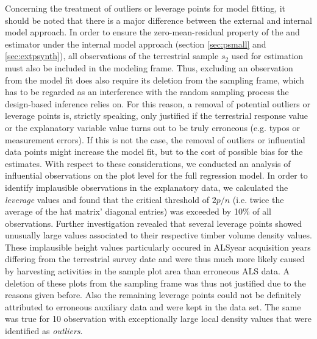 

Concerning the treatment of outliers or leverage points for model fitting, it should be noted that there is a major difference between the external and internal model approach. In order to ensure the zero-mean-residual property of the \psmall{} and \extpsynth{} estimator under the internal model approach (section \ref{sec:psmall} and \ref{sec:extpsynth}), all observations of the terrestrial sample $s_2$ used for estimation must also be included in the modeling frame. Thus, excluding an observation from the model fit does also require its deletion from the sampling frame, which has to be regarded as an interference with the random sampling process the design-based inference relies on. For this reason, a removal of potential outliers or leverage points is, strictly speaking, only justified if the terrestrial response value or the explanatory variable value turns out to be truly erroneous (e.g. typos or measurement errors). If this is not the case, the removal of outliers or influential data points might increase the model fit, but to the cost of possible bias for the estimates. With respect to these considerations, we conducted an analysis of influential observations \citep[pp. 160--167]{fahrmeir2013} on the plot level for the full regression model. In order to identify implausible observations in the explanatory data, we calculated the \textit{leverage} values and found that the critical threshold of $2p/n$ (i.e. twice the average of the hat matrix' diagonal entries) was exceeded by 10\% of all observations. Further investigation revealed that several leverage points showed unusually large \meanheight{} values associated to their respective timber volume density values. These implausible height values particularly occured in ALSyear acquisition years differing from the terrestrial survey date and were thus much more likely caused by harvesting activities in the sample plot area than erroneous ALS data. A deletion of these plots from the sampling frame was thus not justified due to the reasons given before. Also the remaining leverage points could not be definitely attributed to erroneous auxiliary data and were kept in the data set. The same was true for 10 observation with exceptionally large local density values that were identified as \textit{outliers}.




